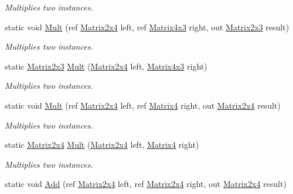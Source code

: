 \begin{DoxyCompactItemize}
\begin{DoxyCompactList}\small\item\em Multiplies two instances. \end{DoxyCompactList}\item 
static void \hyperlink{struct_open_t_k_1_1_matrix2x4_ae623651b62e5ddb6ee99d58f7b8592e6}{Mult} (ref \hyperlink{struct_open_t_k_1_1_matrix2x4}{Matrix2x4} left, ref \hyperlink{struct_open_t_k_1_1_matrix4x3}{Matrix4x3} right, out \hyperlink{struct_open_t_k_1_1_matrix2x3}{Matrix2x3} result)
\begin{DoxyCompactList}\small\item\em Multiplies two instances. \end{DoxyCompactList}\item 
static \hyperlink{struct_open_t_k_1_1_matrix2x3}{Matrix2x3} \hyperlink{struct_open_t_k_1_1_matrix2x4_a72585cb89adfd0cb62c4c0b14d3da60d}{Mult} (\hyperlink{struct_open_t_k_1_1_matrix2x4}{Matrix2x4} left, \hyperlink{struct_open_t_k_1_1_matrix4x3}{Matrix4x3} right)
\begin{DoxyCompactList}\small\item\em Multiplies two instances. \end{DoxyCompactList}\item 
static void \hyperlink{struct_open_t_k_1_1_matrix2x4_a7dcafde1803b3f098f671d0d7e98fc11}{Mult} (ref \hyperlink{struct_open_t_k_1_1_matrix2x4}{Matrix2x4} left, ref \hyperlink{struct_open_t_k_1_1_matrix4}{Matrix4} right, out \hyperlink{struct_open_t_k_1_1_matrix2x4}{Matrix2x4} result)
\begin{DoxyCompactList}\small\item\em Multiplies two instances. \end{DoxyCompactList}\item 
static \hyperlink{struct_open_t_k_1_1_matrix2x4}{Matrix2x4} \hyperlink{struct_open_t_k_1_1_matrix2x4_afafacde1984d37582e875bca823bacb0}{Mult} (\hyperlink{struct_open_t_k_1_1_matrix2x4}{Matrix2x4} left, \hyperlink{struct_open_t_k_1_1_matrix4}{Matrix4} right)
\begin{DoxyCompactList}\small\item\em Multiplies two instances. \end{DoxyCompactList}\item 
static void \hyperlink{struct_open_t_k_1_1_matrix2x4_a67fdf7625968be3ce96078676d2769e5}{Add} (ref \hyperlink{struct_open_t_k_1_1_matrix2x4}{Matrix2x4} left, ref \hyperlink{struct_open_t_k_1_1_matrix2x4}{Matrix2x4} right, out \hyperlink{struct_open_t_k_1_1_matrix2x4}{Matrix2x4} result)

\end{DoxyCompactItemize}
